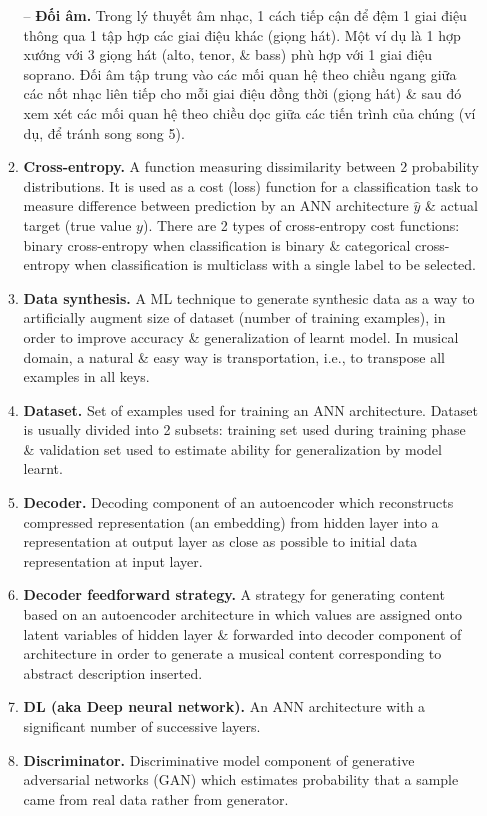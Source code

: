 \documentclass{article}
\begin{document}
\begin{itemize}
\begin{enumerate}
		-- {\bf Đối âm.} Trong lý thuyết âm nhạc, 1 cách tiếp cận để đệm 1 giai điệu thông qua 1 tập hợp các giai điệu khác (giọng hát). Một ví dụ là 1 hợp xướng với 3 giọng hát (alto, tenor, \& bass) phù hợp với 1 giai điệu soprano. Đối âm tập trung vào các mối quan hệ theo chiều ngang giữa các nốt nhạc liên tiếp cho mỗi giai điệu đồng thời (giọng hát) \& sau đó xem xét các mối quan hệ theo chiều dọc giữa các tiến trình của chúng (ví dụ, để tránh song song 5).
		\item {\bf Cross-entropy.} A function measuring dissimilarity between 2 probability distributions. It is used as a cost (loss) function for a classification task to measure difference between prediction by an ANN architecture $\hat{y}$ \& actual target (true value $y$). There are 2 types of cross-entropy cost functions: binary cross-entropy when classification is binary \& categorical cross-entropy when classification is multiclass with a single label to be selected.
		\item {\bf Data synthesis.} A ML technique to generate synthesic data as a way to artificially augment size of dataset (number of training examples), in order to improve accuracy \& generalization of learnt model. In musical domain, a natural \& easy way is transportation, i.e., to transpose all examples in all keys.
		\item {\bf Dataset.} Set of examples used for training an ANN architecture. Dataset is usually divided into 2 subsets: training set used during training phase \& validation set used to estimate ability for generalization by model learnt.
		\item {\bf Decoder.} Decoding component of an autoencoder which reconstructs compressed representation (an embedding) from hidden layer into a representation at output layer as close as possible to initial data representation at input layer.
		\item {\bf Decoder feedforward strategy.} A strategy for generating content based on an autoencoder architecture in which values are assigned onto latent variables of hidden layer \& forwarded into decoder component of architecture in order to generate a musical content corresponding to abstract description inserted.
		\item {\bf DL (aka Deep neural network).} An ANN architecture with a significant number of successive layers.
		\item {\bf Discriminator.} Discriminative model component of generative adversarial networks (GAN) which estimates probability that a sample came from real data rather from generator.

\end{enumerate}
\end{itemize}
\end{document}

